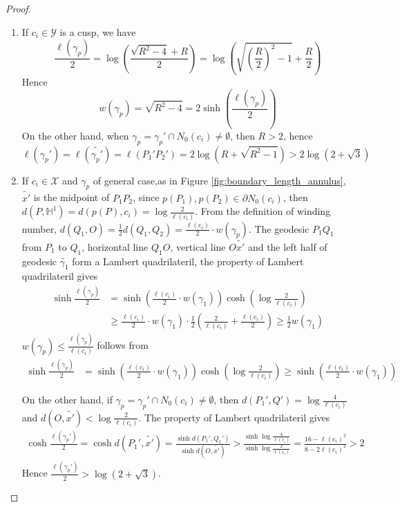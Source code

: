 \documentclass[11pt, a4paper]{article}
\theoremstyle{definition}
\theoremstyle{remark}
\newcommand{\bbh}{\mathbb{H}}
\newcommand{\calx}{\mathcal{X}}
\newcommand{\caly}{\mathcal{Y}}
\newcommand{\bracket}[1]{\left( #1 \right)}
\begin{document}
\begin{proof}

 \begin{enumerate}

\item
If $c_i\in\caly$ is a cusp, we have
$$\frac{\ell(\gamma_p)}2=\log\bracket{\frac{\sqrt{R^2-4}+R}{2}}=\log\bracket{\sqrt{(\frac{R}2)^2-1}+\frac{R}2}$$
Hence
$$w(\gamma_p)=\sqrt{R^2-4}=2\sinh\bracket{\frac{\ell(\gamma_p)}2}$$
On the other hand, when $\gamma_p=\gamma_p'\cap N_0(c_i)\neq\emptyset$, then $R>2$, hence
$$\ell(\gamma_p')=\ell(\widetilde{\gamma_p'})=\ell(P_1'P_2')=2\log(R+\sqrt{R^2-1})>2\log(2+\sqrt3)$$

\item
If $c_i\in\calx$ and $\gamma_p$ of general case,as in Figure \ref{fig:boundary_length_annulus}, $\widetilde{x'}$ is the midpoint of $P_1P_2$, since $p(P_1),p(P_2)\in\partial N_0(c_i)$, then $d(P,\bbh^1)=d(p(P),c_i)=\log\frac2{\ell(c_i)}$. From the definition of winding number, $d(Q_1,O)=\frac12d(Q_1,Q_2)=\frac{\ell(c_i)}2\cdot w(\gamma_p)$. The geodesic $P_1Q_1$ from $P_1$ to $Q_1$, horizontal line $Q_1O$, vertical line $O\widetilde{x'}$ and the left half of geodesic $\widetilde{\gamma_1}$ form a Lambert quadrilateril, the property of Lambert quadrilateril gives
\begin{align*}
\sinh\frac{\ell(\gamma_p)}2&=\sinh\bracket{\frac{\ell(c_i)}2\cdot w(\gamma_1)}\cosh\bracket{\log\frac2{\ell(c_i)}}\\
&\geqslant\frac{\ell(c_i)}2\cdot w(\gamma_1)\cdot\frac12\bracket{\frac2{\ell(c_i)}+\frac{\ell(c_i)}2}\geqslant\frac12w(\gamma_1)
\end{align*}
$w(\gamma_p)\leqslant\frac{\ell(\gamma_p)}{\ell(c_i)}$ follows from
\begin{align*}
\sinh\frac{\ell(\gamma_p)}2&=\sinh\bracket{\frac{\ell(c_i)}2\cdot w(\gamma_1)}\cosh\bracket{\log\frac2{\ell(c_i)}}\geqslant\sinh\bracket{\frac{\ell(c_i)}2\cdot w(\gamma_1)}
\end{align*}


On the other hand, if $\gamma_p=\gamma_p'\cap N_0(c_i)\neq\emptyset$, then $d(P_1',Q')=\log\frac4{\ell(c_i)}$ and $d(O,\widetilde{x'})<\log\frac2{\ell(c_i)}$. The property of Lambert quadrilateril gives
\begin{align*}
  \cosh{\frac{\ell(\gamma_p')}2}=\cosh{d(P_1',\widetilde{x'})}=\frac{\sinh{d(P_1',Q_1')}}{\sinh{d(O,\widetilde{x'})}}>\frac{\sinh{\log\frac4{\ell(c_i)}}}{\sinh{\log\frac2{\ell(c_i)}}}=\frac{16-\ell(c_i)^2}{8-2\ell(c_i)^2}>2
\end{align*}
Hence $\frac{\ell(\gamma_p')}2>\log(2+\sqrt3)$.



\end{enumerate}
\end{proof}
\end{document}
